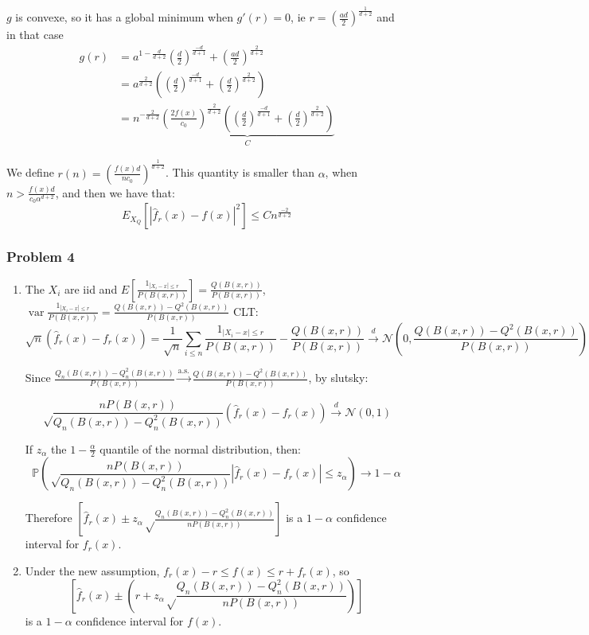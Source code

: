\emph{}\documentclass[12pt]{article}
\DeclareMathOperator{\var}{var}
\newcommand{\Q}[1]{\subsubsection*{Problem #1}}
\begin{document}
\begin{enumerate}
  $g$ is convexe, so it has a global minimum when $g'(r) = 0$, ie $r = \left(\frac{ad}2 \right)^{\frac1{d+2}}$
  and in that case
  \begin{align*}
    g(r) &= a^{1-\frac{d}{d+2}} (\frac{d}{2})^{\frac{-d}{d+1}} +  (\frac{ad}2)^{\frac2{d+2}}
    \\&= a^{\frac{2}{d+2}} \left( (\frac{d}{2})^{\frac{-d}{d+1}} + (\frac{d}2)^{\frac2{d+2}} \right)
    \\&=  n^{-\frac2{d+2}} \underbrace{(\frac{2f(x)}{c_0})^{\frac2{d+2}}\left( (\frac{d}{2})^{\frac{-d}{d+1}} + (\frac{d}2)^{\frac2{d+2}} \right)}_C
  \end{align*}

  We define $r(n) = \left(\frac{f(x)d}{n c_0} \right)^{\frac1{d+2}}$.
  This quantity is smaller than $\alpha$, when $ n > \frac{f(x)d}{c_0 \alpha^{d+2}}$, and then we have that:
  $$E_{X_Q}[|\hat f_r(x) - f(x)|^2]  \le C n^{\frac{-2} {d+2}}$$
\end{enumerate}

\Q{4}

\begin{enumerate}
\item
  The $X_i$ are iid and $E[\frac{1_{|X_i - x| \le r}}{P(B(x,r))}] = \frac{Q(B(x,r))}{P(B(x,r))}$, $\var \frac{1_{|X_i - x| \le r}}{P(B(x,r))} =  \frac{Q(B(x,r)) - Q^2(B(x,r))}{P(B(x,r))}$
  CLT:
  $$\sqrt{n} (\hat f_r(x) - f_r(x)) = \frac1{\sqrt n} \sum_{i\le n} \frac{1_{|X_i - x| \le r}}{P(B(x,r))} -  \frac{Q(B(x,r))}{P(B(x,r))} \overset{d}{\rightarrow} \mathcal N(0,  \frac{Q(B(x,r)) - Q^2(B(x,r))}{P(B(x,r))})$$

  Since $\frac{Q_n(B(x,r)) - Q_n^2(B(x,r))}{P(B(x,r))} \overset{\text{a.s.}}\rightarrow \frac{Q(B(x,r)) - Q^2(B(x,r))}{P(B(x,r))}$, by slutsky:

  $$\sqrt \frac{ nP(B(x,r))}{Q_n(B(x,r)) - Q_n^2(B(x,r))} (\hat f_r(x) - f_r(x))  \overset{d}{\rightarrow} \mathcal N(0, 1)$$

  If $z_{\alpha}$ the $1-\frac \alpha 2$ quantile of the normal distribution, then:
  $$\mathbb P \left(\sqrt\frac{nP(B(x,r))}{Q_n(B(x,r)) - Q_n^2(B(x,r))} |\hat f_r(x) - f_r(x)| \le z_{\alpha}\right) \rightarrow 1 - \alpha$$

  Therefore $[\hat f_r(x) \pm z_\alpha \sqrt \frac{Q_n(B(x,r)) - Q_n^2(B(x,r))}{nP(B(x,r))}]$ is a $1-\alpha$ confidence interval for $f_r(x)$.


\item Under the new assumption, $f_r(x) - r \le f(x) \le r + f_r(x)$, so
  $$[\hat f_r(x) \pm \left(r + z_\alpha \sqrt \frac{Q_n(B(x,r)) - Q_n^2(B(x,r))}{nP(B(x,r))}\right)]$$ is a $1-\alpha$ confidence interval for $f(x)$.
\end{enumerate}
\end{document}
